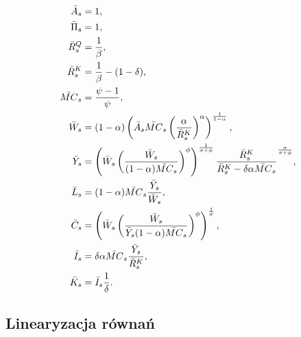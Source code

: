 \begin{align}
    \bar{A}_s &= 1, \\
    \bar{\Pi}_s &= 1, \\
    \bar{R}_s^Q &= \frac{1}{\beta}, \\
    \bar{R}_s^K &= \frac{1}{\beta} - (1 - \delta), \\
    \label{eq:mc_steady_solution}
    \bar{MC}_s &= \frac{\psi - 1}{\psi}, \\
    \bar{W}_s &= (1-\alpha)\left(\bar{A}_s \bar{MC}_s \left(\frac{\alpha}{\bar{R}_s^{K}}\right)^\alpha\right)^{\frac{1}{1-\alpha}}, \\
    \bar{Y}_s &= \left( \bar{W}_s \left( \frac{\bar{W}_s}{(1-\alpha)\bar{MC}_s}\right)^\phi\right)^{\frac{1}{\sigma + \phi}} \frac{\bar{R}_s^K}{\bar{R}_s^K - \delta \alpha \bar{MC}_s}^{\frac{\sigma}{\sigma + \phi}}, \\
    \bar{L}_s &= (1-\alpha)\bar{MC}_s\frac{\bar{Y}_s}{\bar{W}_s}, \\
    \bar{C}_s &= \left( \bar{W}_s \left( \frac{\bar{W}_s}{\bar{Y}_s(1-\alpha)\bar{MC}_s}\right)^\phi\right)^{\frac{1}{\sigma}}, \\
    \bar{I}_s &= \delta \alpha \bar{MC}_s \frac{\bar{Y}_s}{\bar{R}_s^K}, \\
    \bar{K}_s &= \bar{I}_s\frac{1}{\delta}.
\end{align}

\subsection{Linearyzacja równań}

